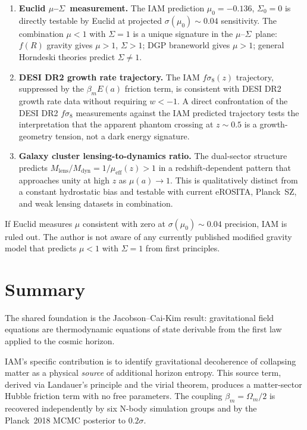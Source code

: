 \documentclass[12pt]{article}
\newcommand{\Oms}{\Omega_m}
\newcommand{\bm}{\beta_m}
\newcommand{\Ea}{E(a)}
\newcommand{\musig}{$\mu$--$\Sigma$}
\begin{document}
\begin{enumerate}
  \item \textbf{Euclid \musig\ measurement.}  The IAM prediction
        $\mu_0 = -0.136$, $\Sigma_0 = 0$ is directly testable by Euclid at
        projected $\sigma(\mu_0)\sim0.04$ sensitivity.  The combination
        $\mu < 1$ with $\Sigma = 1$ is a unique signature in the \musig\ plane:
        $f(R)$ gravity gives $\mu > 1$, $\Sigma > 1$; DGP braneworld gives
        $\mu > 1$; general Horndeski theories predict $\Sigma\ne1$.

  \item \textbf{DESI DR2 growth rate trajectory.}  The IAM $f\sigma_8(z)$
        trajectory, suppressed by the $\bm\Ea$ friction term, is consistent
        with DESI DR2 growth rate data without requiring $w < -1$.  A direct
        confrontation of the DESI DR2 $f\sigma_8$ measurements against the
        IAM predicted trajectory tests the interpretation that the apparent
        phantom crossing at $z\sim0.5$ is a growth-geometry tension, not a
        dark energy signature.

  \item \textbf{Galaxy cluster lensing-to-dynamics ratio.}  The dual-sector
        structure predicts $M_\mathrm{lens}/M_\mathrm{dyn} = 1/\mu_\mathrm{eff}(z) > 1$
        in a redshift-dependent pattern that approaches unity at high $z$ as
        $\mu(a)\to1$.  This is qualitatively distinct from a constant
        hydrostatic bias and testable with current eROSITA, Planck~SZ, and
        weak lensing datasets in combination.
\end{enumerate}

If Euclid measures $\mu$ consistent with zero at $\sigma(\mu_0)\sim0.04$
precision, IAM is ruled out.  The author is not aware of any currently published modified gravity model
that predicts $\mu < 1$ with $\Sigma = 1$ from first principles.

\section{Summary}

The shared foundation is the Jacobson--Cai-Kim result: gravitational field equations are
thermodynamic equations of state derivable from the first law applied to the cosmic
horizon.

IAM's specific contribution is to identify gravitational decoherence of collapsing
matter as a physical \emph{source} of additional horizon entropy.  This source
term, derived via Landauer's principle and the virial theorem, produces a
matter-sector Hubble friction term with no free parameters.  The coupling
$\bm = \Oms/2$ is recovered independently by six N-body simulation groups and by
the Planck~2018 MCMC posterior to $0.2\sigma$.
\end{document}
